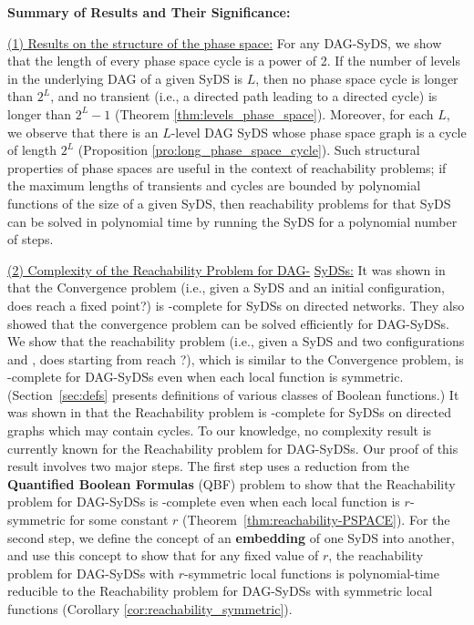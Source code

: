 \smallskip

\noindent
\textbf{Summary of Results and Their Significance:}

\smallskip

\noindent
\underline{(1) Results on the structure of the phase space:}
For any DAG-SyDS, we show that
the length of every phase space cycle is a power of 2.
If the number of levels in the underlying DAG of a given SyDS is $L$,
then no phase space cycle is longer than $2^L$,
and no transient (i.e., a directed path leading to a directed
cycle) is longer than $2^L-1$
(Theorem \ref{thm:levels_phase_space}).
Moreover, for each $L$, we observe that
there is an $L$-level DAG SyDS whose phase 
space graph is a cycle of length $2^L$
(Proposition \ref{pro:long_phase_space_cycle}).
Such structural properties of phase spaces are useful in the context of
reachability problems; if the maximum lengths of transients
and cycles are bounded by polynomial functions of the size of a given SyDS,
then reachability problems for that SyDS can be solved in polynomial time
by running the SyDS for a polynomial number of steps.

\smallskip

\noindent
\underline{(2) Complexity of the Reachability Problem for DAG-}\newline
\underline{SyDSs:} 
It was shown in
\cite{Chistikov-etal-2020} that the Convergence problem
(i.e., given a SyDS \cals{} and an initial configuration,
does \cals{} reach a fixed point?) is \cpsp-complete
for SyDSs on directed networks.
They also showed that the convergence problem can be solved efficiently
for DAG-SyDSs.
We show that the reachability problem
(i.e., given a SyDS \cals{} and two configurations \calc{} and \cald{},
does \cals{} starting from \calc{} reach \cald{}?),
which is similar to the Convergence problem, 
is \cpsp-complete for DAG-SyDSs even
when each local function is symmetric.
(Section~\ref{sec:defs} presents definitions of various classes
of Boolean functions.)
It was shown in \cite{OU-2017} that the Reachability
problem is \cpsp-complete for SyDSs on directed graphs 
which may contain cycles.
To our knowledge, no complexity result is currently known for
the Reachability problem for DAG-SyDSs.
Our proof of this result involves two major steps.
The first step uses a reduction from the \textbf{Quantified Boolean Formulas}
(QBF) problem \cite{GJ-1979} to show that the Reachability problem for DAG-SyDSs is
\cpsp-complete even when each local function is $r$-symmetric for 
some constant $r$ (Theorem~\ref{thm:reachability-PSPACE}).
For the second step,
we define the concept of an \textbf{embedding} of one SyDS into another,
and use this concept to show that
for any fixed value of $r$, 
the reachability problem for DAG-SyDSs with $r$-symmetric local functions 
is polynomial-time reducible to the Reachability problem for DAG-SyDSs with
symmetric  local functions (Corollary \ref{cor:reachability_symmetric}).

